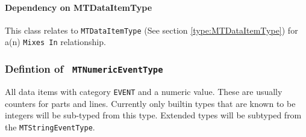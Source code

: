 \paragraph{Dependency on MTDataItemType}

This class relates to \texttt{MTDataItemType} (See section \ref{type:MTDataItemType}) for a(n) \texttt{Mixes In} relationship.

\FloatBarrier
\subsubsection{Defintion of \texttt{ MTNumericEventType}}
  \label{type:MTNumericEventType}

\FloatBarrier

All data items with category \texttt{EVENT} and a numeric value. These are usually counters for 
parts and lines. Currently only builtin types that are known to be integers will be
sub-typed from this type. Extended types will be subtyped from the \texttt{MTStringEventType}.

